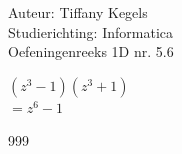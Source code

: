 \documentclass[a4paper]{article}
\begin{document}
  
\noindent \large Auteur: Tiffany Kegels \\
\noindent \large Studierichting: Informatica\\
\noindent \large Oefeningenreeks 1D nr. 5.6\\

\medskip

\normalsize

$(z^3 - 1)(z^3 + 1)$\\

$= z^6 - 1$\\

\begin{thebibliography}{999}

\end{thebibliography}
\end{document}
